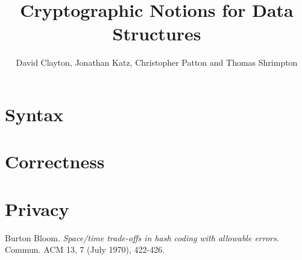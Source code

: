 \documentclass[11pt, pdftex]{article}
\title{\bf Cryptographic Notions for Data Structures}
\author{David Clayton, Jonathan Katz, Christopher Patton and Thomas Shrimpton}
\begin{document}
\maketitle

\section{Syntax}


\section{Correctness}


\section{Privacy}


\begin{thebibliography}{9}
Burton Bloom.
\textit{Space/time trade-offs in hash coding with allowable errors.}
Commun. ACM 13, 7 (July 1970), 422-426.
\end{thebibliography}

%
\end{document}
